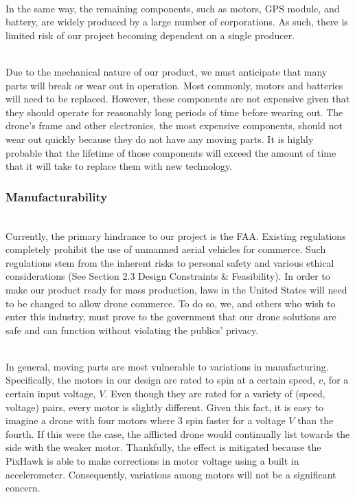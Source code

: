 \documentclass[12pt]{extarticle}
\begin{document}
\ \\
In the same way, the remaining components, such as motors, GPS module, and battery, are widely produced by a large number of corporations.  As such, there is limited risk of our project becoming dependent on a single producer.  

\ \\
Due to the mechanical nature of our product, we must anticipate that many parts will break or wear out in operation.  Most commonly, motors and batteries will need to be replaced.  However, these components are not expensive given that they should operate for reasonably long periods of time before wearing out.  The drone's frame and other electronics, the most expensive components, should not wear out quickly because they do not have any moving parts.  It is highly probable that the lifetime of those components will exceed the amount of time that it will take to replace them with new technology.   

\subsubsection{Manufacturability}

\ \\
Currently, the primary hindrance to our project is the FAA.  Existing regulations completely prohibit the use of unmanned aerial vehicles for commerce.  Such regulations stem from the inherent risks to personal safety and various ethical considerations (See Section 2.3 Design Constraints \& Feasibility).  In order to make our product ready for mass production, laws in the United States will need to be changed to allow drone commerce.  To do so, we, and others who wish to enter this industry, must prove to the government that our drone solutions are safe and can function without violating the publics' privacy.

\ \\
In general, moving parts are most vulnerable to variations in manufacturing.  Specifically, the motors in our design are rated to spin at a certain speed, $v$, for a certain input voltage, $V$.  Even though they are rated for a variety of (speed, voltage) pairs, every motor is slightly different.  Given this fact, it is easy to imagine a drone with four motors where 3 spin faster for a voltage $V$ than the fourth.  If this were the case, the afflicted drone would continually list towards the side with the weaker motor.  Thankfully, the effect is mitigated because the PixHawk is able to make corrections in motor voltage using a built in accelerometer.  Consequently, variations among motors will not be a significant concern.  
\end{document}
